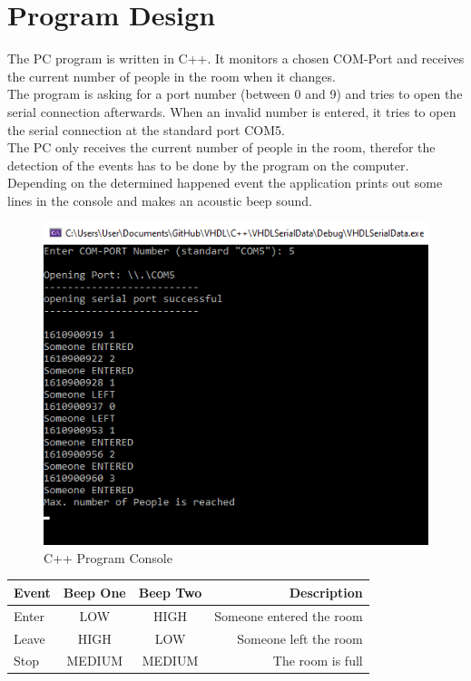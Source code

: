 \documentclass[12pt,a4 paper] {report}
\begin{document}
\chapter{Program Design}
The PC program is written in C++. It monitors a chosen COM-Port and receives the current number of people in the room when it changes.\\
The program is asking for a port number (between 0 and 9) and tries to open the serial connection afterwards. When an invalid number is entered, 
it tries to open the serial connection at the standard port COM5. \\
The PC only receives the current number of people in the room, therefor the detection of the events has to be done by the program on the computer. 
Depending on the determined happened event the application prints out some lines in the console and makes an acoustic beep sound.
\begin{figure}[h]
	\centering	
	\includegraphics[scale=0.8]{../png/program.png}
	\caption{C++ Program Console}
\end{figure}
\begin{center}
	\begin{tabular}{|l|c|c|r|}
		\hline
		\textbf{Event} & \textbf{Beep One} & \textbf{Beep Two} & \textbf{Description} \\
		\hline
		Enter & LOW & HIGH & Someone entered the room \\
		\hline
		Leave & HIGH & LOW & Someone left the room \\
		\hline
		Stop & MEDIUM & MEDIUM & The room is full \\
		\hline
	\end{tabular}
\end{center}
\end{document}
